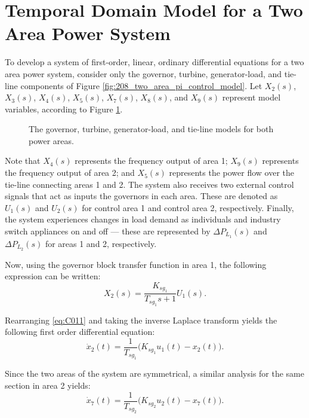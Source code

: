 \section{Temporal Domain Model for a Two Area Power System} \label{app:C1_power_system_ode}

To develop a system of first-order, linear, ordinary differential equations for a two area power system, consider only the governor, turbine, generator-load, and tie-line components of Figure \ref{fig:208_two_area_pi_control_model}. Let $X_2(s)$, $X_3(s)$, $X_4(s)$, $X_5(s)$, $X_7(s)$, $X_8(s)$, and $X_9(s)$ represent model variables, according to Figure \ref{fig:C101}.

\begin{figure}[h]
	\centering
	\resizebox{\textwidth}{!}{}
	\caption[Combined governor, turbine, generator-load, and tie-line for a two-area power system]{The governor, turbine, generator-load, and tie-line models for both power areas.}
	\label{fig:C101}
\end{figure}

Note that $X_4(s)$ represents the frequency output of area 1; $X_9(s)$ represents the frequency output of area 2; and $X_5(s)$ represents the power flow over the tie-line connecting areas 1 and 2. The system also receives two external control signals that act as inputs the governors in each area. These are denoted as $U_1(s)$ and $U_2(s)$ for control area 1 and control area 2, respectively. Finally, the system experiences changes in load demand as individuals and industry switch appliances on and off --- these are represented by $\Delta P_{L_1}(s)$ and $\Delta P_{L_2}(s)$ for areas 1 and 2, respectively.

Now, using the governor block transfer function in area 1, the following expression can be written:
\begin{equation}
	X_2(s) = \frac{K_{sg_1}}{T_{sg_1}s + 1} U_1(s). \label{eq:C011}
\end{equation}

Rearranging \ref{eq:C011} and taking the inverse Laplace transform yields the following first order differential equation:
\begin{equation}
	\dot{x}_2(t) = \frac{1}{T_{sg_1}}\big( K_{sg_1} u_1(t) - x_2(t) \big). \label{eq:C012}
\end{equation}

Since the two areas of the system are symmetrical, a similar analysis for the same section in area 2 yields:
\begin{equation}
	\dot{x}_7(t) = \frac{1}{T_{sg_2}}\big( K_{sg_2} u_2(t) - x_7(t) \big). \label{eq:C013}
\end{equation}

